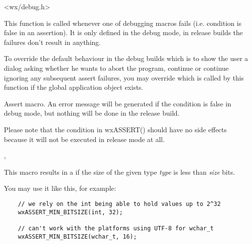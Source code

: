 
<wx/debug.h>


\label{wxonassert}


This function is called whenever one of debugging macros fails (i.e. condition
is false in an assertion). It is only defined in the debug mode, in release
builds the  failures don't result in anything.

To override the default behaviour in the debug builds which is to show the user
a dialog asking whether he wants to abort the program, continue or continue
ignoring any subsequent assert failures, you may override
 which is called by this function if
the global application object exists.


\label{wxassert}


Assert macro. An error message will be generated if the condition is false in
debug mode, but nothing will be done in the release build.

Please note that the condition in wxASSERT() should have no side effects
because it will not be executed in release mode at all.


,\\


\label{wxassertminbitsize}


This macro results in a
 if the size
of the given type {\it type} is less than {\it size} bits.

You may use it like this, for example:

\begin{verbatim}
    // we rely on the int being able to hold values up to 2^32
    wxASSERT_MIN_BITSIZE(int, 32);

    // can't work with the platforms using UTF-8 for wchar_t
    wxASSERT_MIN_BITSIZE(wchar_t, 16);
\end{verbatim}


